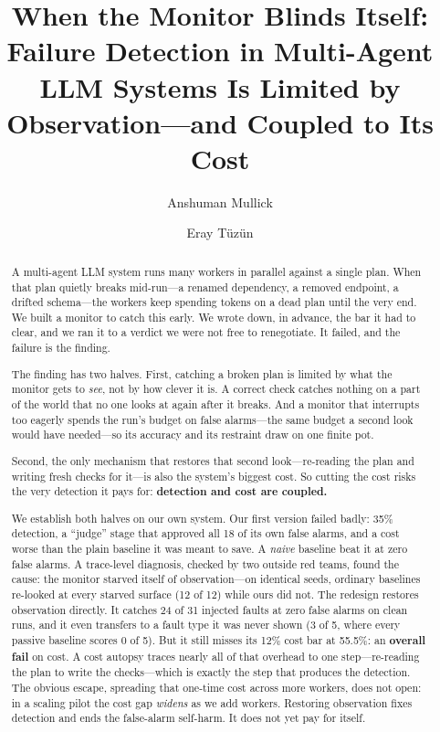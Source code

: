 \documentclass[acmsmall,screen]{acmart}
\begin{document}
\title{When the Monitor Blinds Itself: Failure Detection in Multi-Agent LLM
Systems Is Limited by Observation---and Coupled to Its Cost}

\author{Anshuman Mullick}

\author{Eray T\"uz\"un}

\begin{abstract}
A multi-agent LLM system runs many workers in parallel against a single plan.
When that plan quietly breaks mid-run---a renamed dependency, a removed
endpoint, a drifted schema---the workers keep spending tokens on a dead plan
until the very end. We built a monitor to catch this early. We wrote down, in
advance, the bar it had to clear, and we ran it to a verdict we were not free
to renegotiate. It failed, and the failure is the finding.

The finding has two halves. First, catching a broken plan is limited by what
the monitor gets to \emph{see}, not by how clever it is. A correct check
catches nothing on a part of the world that no one looks at again after it
breaks. And a monitor that interrupts too eagerly spends the run's budget on
false alarms---the same budget a second look would have needed---so its
accuracy and its restraint draw on one finite pot.

Second, the only mechanism that restores that second look---re-reading the plan
and writing fresh checks for it---is also the system's biggest cost. So cutting
the cost risks the very detection it pays for: \textbf{detection and cost are
coupled.}

We establish both halves on our own system. Our first version failed badly:
35\% detection, a ``judge'' stage that approved all 18 of its own false alarms,
and a cost worse than the plain baseline it was meant to save. A \emph{naive}
baseline beat it at zero false alarms. A trace-level diagnosis, checked by two
outside red teams, found the cause: the monitor starved itself of
observation---on identical seeds, ordinary baselines re-looked at every starved
surface (12 of 12) while ours did not. The redesign restores observation
directly. It catches 24 of 31 injected faults at zero false alarms on clean
runs, and it even transfers to a fault type it was never shown (3 of 5, where
every passive baseline scores 0 of 5). But it still misses its 12\% cost bar at
55.5\%: an \textbf{overall fail} on cost. A cost autopsy traces nearly all of
that overhead to one step---re-reading the plan to write the checks---which is
exactly the step that produces the detection. The obvious escape, spreading
that one-time cost across more workers, does not open: in a scaling pilot the
cost gap \emph{widens} as we add workers. Restoring observation fixes detection
and ends the false-alarm self-harm. It does not yet pay for itself.
\end{abstract}
\end{document}
